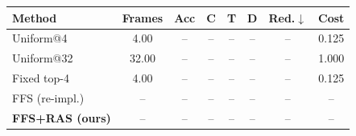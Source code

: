 \begin{tabular}{@{}lccccccc@{}}
\toprule
Method & Frames & Acc & C & T & D & Red.$\downarrow$ & Cost \\
\midrule
Uniform@4 & 4.00 & -- & -- & -- & -- & -- & 0.125 \\
Uniform@32 & 32.00 & -- & -- & -- & -- & -- & 1.000 \\
Fixed top-4 & 4.00 & -- & -- & -- & -- & -- & 0.125 \\
FFS (re-impl.) & -- & -- & -- & -- & -- & -- & -- \\
\textbf{FFS+RAS (ours)} & -- & -- & -- & -- & -- & -- & -- \\
\bottomrule
\end{tabular}
